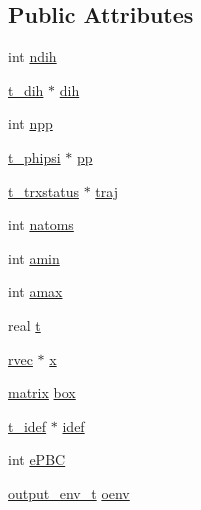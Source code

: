 \subsection*{\-Public \-Attributes}
\begin{DoxyCompactItemize}
\item 
int \hyperlink{structt__xrama_af27c6640bae97a88c5c294afbf56f974}{ndih}
\item 
\hyperlink{structt__dih}{t\-\_\-dih} $\ast$ \hyperlink{structt__xrama_aae4c81bd4913112d8ea09487d0b27c9a}{dih}
\item 
int \hyperlink{structt__xrama_ad71941f0bdfe6716156f101fb1bd2e66}{npp}
\item 
\hyperlink{structt__phipsi}{t\-\_\-phipsi} $\ast$ \hyperlink{structt__xrama_a7c123498601c76825625625ee4672139}{pp}
\item 
\hyperlink{structt__trxstatus}{t\-\_\-trxstatus} $\ast$ \hyperlink{structt__xrama_adf20ce61d0b53825182d2f6e3dd67657}{traj}
\item 
int \hyperlink{structt__xrama_adcf15cf31ff1ecaf7f8bbb50f8ccfea2}{natoms}
\item 
int \hyperlink{structt__xrama_a1073cac665279d341f4e48c482f8ee56}{amin}
\item 
int \hyperlink{structt__xrama_a9b86d04d5bee01eb4a19535e4af33b3a}{amax}
\item 
real \hyperlink{structt__xrama_a65cd92ec70111dcac6bbc219b1f50a27}{t}
\item 
\hyperlink{share_2template_2gromacs_2types_2simple_8h_aa02a552a4abd2f180c282a083dc3a999}{rvec} $\ast$ \hyperlink{structt__xrama_a43148aa9cfd8a5fa23683b967691d908}{x}
\item 
\hyperlink{share_2template_2gromacs_2types_2simple_8h_a7ea9c2a830d3f743b887387e33645a83}{matrix} \hyperlink{structt__xrama_af9253796fa84bcb079853ec5593cc8e7}{box}
\item 
\hyperlink{structt__idef}{t\-\_\-idef} $\ast$ \hyperlink{structt__xrama_ad58aaf781616ee525cf5bb7bc96cdd93}{idef}
\item 
int \hyperlink{structt__xrama_a5ae3efcc47d0e64bb16ac9204ea308d1}{e\-P\-B\-C}
\item 
\hyperlink{include_2types_2oenv_8h_a6a48d77d95132d7318780544821da6a5}{output\-\_\-env\-\_\-t} \hyperlink{structt__xrama_acb66043c08644c6d17306af4be57b786}{oenv}
\end{DoxyCompactItemize}


